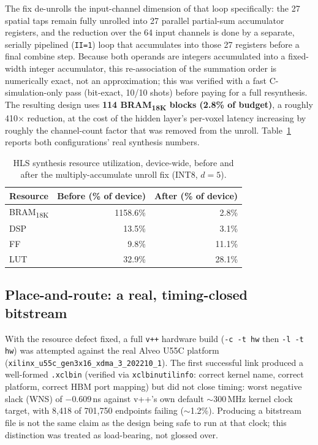 \documentclass[conference]{IEEEtran}
\begin{document}
The fix de-unrolls the input-channel dimension of that loop specifically: the 27 spatial taps remain fully unrolled into 27 parallel partial-sum accumulator registers, and the reduction over the 64 input channels is done by a separate, serially pipelined (\texttt{II=1}) loop that accumulates into those 27 registers before a final combine step. Because both operands are integers accumulated into a fixed-width integer accumulator, this re-association of the summation order is numerically exact, not an approximation; this was verified with a fast C-simulation-only pass (bit-exact, 10/10 shots) before paying for a full resynthesis. The resulting design uses \textbf{114 BRAM\textsubscript{18K} blocks (2.8\% of budget)}, a roughly 410\(\times\) reduction, at the cost of the hidden layer's per-voxel latency increasing by roughly the channel-count factor that was removed from the unroll. Table~\ref{tab:hls-before-after} reports both configurations' real synthesis numbers.

\begin{table}[t]
\centering
\caption{HLS synthesis resource utilization, device-wide, before and after the multiply-accumulate unroll fix (INT8, \(d=5\)).}
\label{tab:hls-before-after}
\begin{tabular}{lrr}
\toprule
Resource & Before (\% of device) & After (\% of device) \\
\midrule
BRAM\textsubscript{18K} & 1158.6\% & 2.8\% \\
DSP & 13.5\% & 3.1\% \\
FF & 9.8\% & 11.1\% \\
LUT & 32.9\% & 28.1\% \\
\bottomrule
\end{tabular}
\end{table}

\subsection{Place-and-route: a real, timing-closed bitstream}
\label{subsec:results-hw}

With the resource defect fixed, a full \texttt{v++} hardware build (\texttt{-c -t hw} then \texttt{-l -t hw}) was attempted against the real Alveo U55C platform (\texttt{xilinx\_u55c\_gen3x16\_xdma\_3\_202210\_1}). The first successful link produced a well-formed \texttt{.xclbin} (verified via \texttt{xclbinutilinfo}: correct kernel name, correct platform, correct HBM port mapping) but did not close timing: worst negative slack (WNS) of \(-0.609\)\,ns against v++'s own default \(\sim\)300\,MHz kernel clock target, with 8{,}418 of 701{,}750 endpoints failing (\(\sim\)1.2\%). Producing a bitstream file is not the same claim as the design being safe to run at that clock; this distinction was treated as load-bearing, not glossed over.
\end{document}
